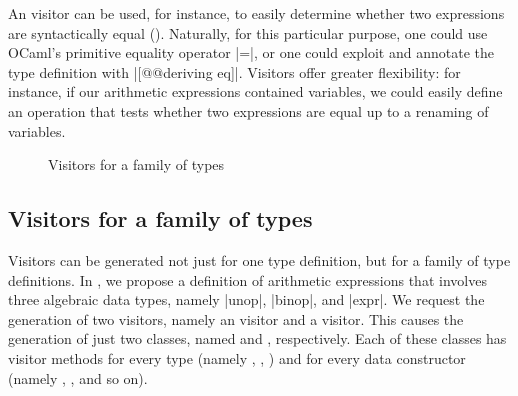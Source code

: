 \documentclass[onecolumn,11pt,nocopyrightspace]{sigplanconf}
\begin{document}
An \itertwo visitor can be used, for instance, to easily determine whether two
expressions are syntactically equal (). Naturally, for this
particular purpose, one could use OCaml's primitive equality operator \oc|=|,
or one could exploit \ppxderiving and annotate the type definition with
\oc|[@@deriving eq]|. Visitors offer greater flexibility: for instance, if our
arithmetic expressions contained variables, we could easily define an
operation that tests whether two expressions are equal up to a renaming of
variables.


\begin{figure}[t]
\caption{Visitors for a family of types}
\label{fig:expr06}
\end{figure}

\subsection{Visitors for a family of types}

Visitors can be generated not just for one type definition, but for a family
of type definitions. In , we propose a definition of
arithmetic expressions that involves three algebraic data types, namely
\oc|unop|, \oc|binop|, and \oc|expr|. We request the generation of two
visitors, namely an \iter visitor and a \map visitor. This causes the
generation of just two classes, named \iter and \map, respectively. Each of
these classes has visitor methods for every type (namely ,
, ) and for every data constructor
(namely , , and so on).

\end{document}
